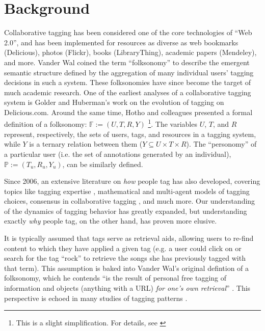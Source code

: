 \section{Background}
\label{sec_related}

Collaborative tagging has been considered one of the core technologies of ``Web 2.0'', and has been implemented for resources as diverse as web bookmarks (Delicious), photos (Flickr), books (LibraryThing), academic papers (Mendeley), and more. Vander Wal \cite{VanderWal2007} coined the term ``folksonomy'' to describe the emergent semantic structure defined by the aggregation of many individual users' tagging decisions in such a system. These folksonomies have since become the target of much academic research. One of the earliest analyses of a collaborative tagging system is Golder and Huberman's \cite{Golder2006} work on the evolution of tagging on Delicious.com.  Around the same time, Hotho and colleagues \cite{Hotho2006a} presented a formal definition of a folksonomy: $\mathbb{F} := (U,T,R,Y)$ \footnote{This is a slight simplification. For details, see \cite{Hotho2006a}}. The variables $U$, $T$, and $R$ represent, respectively, the sets of users, tags, and resources in a tagging system, while $Y$ is a ternary relation between them ($Y \subseteq U \times T \times R$). The ``personomy'' of a particular user (i.e. the set of annotations generated by an individual),  $\mathbb{P} := (T_{u},R_{u},Y_{u})$, can be similarly defined.

Since 2006, an extensive literature on \emph{how} people tag has also developed, covering topics like tagging expertise \cite{Yeung2011},	mathematical \cite{Cattuto2007a} and multi-agent \cite{Lorince2013} models of tagging choices, consensus in collaborative tagging \cite{Halpin2007,Robu2009}, and much more. Our understanding of the dynamics of tagging behavior has greatly expanded, but understanding exactly \emph{why} people tag, on the other hand, has proven more elusive.

It is typically assumed that tags serve as retrieval aids, allowing users to re-find content to which they have applied a given tag (e.g. a user could click on or search for the tag ``rock'' to retrieve the songs she has previously tagged with that term). This assumption is baked into Vander Wal's original defintion of a folksonomy, which he contends ``is the result of personal free tagging of information and objects (anything with a URL) \emph{for one's own retrieval}'' \cite[emphasis added]{VanderWal2007}. This perspective is echoed in many studies of tagging patterns \cite{Glushko2008,Halpin2007,Golder2006}.

